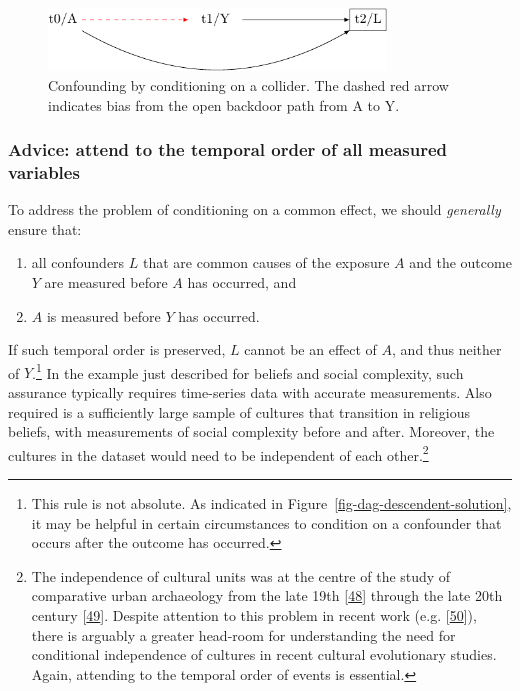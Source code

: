 \documentclass[
  singlecolumn]{article}
\providecommand{\tightlist}{%
  \setlength{\itemsep}{0pt}\setlength{\parskip}{0pt}}\usepackage{longtable,booktabs,array}
\begin{document}
\begin{figure}

{\centering \includegraphics[width=0.8\textwidth,height=\textheight]{causal-dags_files/figure-pdf/fig-dag-common-effect-1.pdf}

}

\caption{\label{fig-dag-common-effect}Confounding by conditioning on a
collider. The dashed red arrow indicates bias from the open backdoor
path from A to Y.}

\end{figure}

\hypertarget{advice-attend-to-the-temporal-order-of-all-measured-variables-1}{%
\subsubsection{Advice: attend to the temporal order of all measured
variables}\label{advice-attend-to-the-temporal-order-of-all-measured-variables-1}}

To address the problem of conditioning on a common effect, we should
\emph{generally} ensure that:

\begin{enumerate}
\def\labelenumi{\arabic{enumi}.}
\tightlist
\item
  all confounders \(L\) that are common causes of the exposure \(A\) and
  the outcome \(Y\) are measured before \(A\) has occurred, and
\item
  \(A\) is measured before \(Y\) has occurred.
\end{enumerate}

If such temporal order is preserved, \(L\) cannot be an effect of \(A\),
and thus neither of \(Y\).\footnote{This rule is not absolute. As
  indicated in Figure~\ref{fig-dag-descendent-solution}, it may be
  helpful in certain circumstances to condition on a confounder that
  occurs after the outcome has occurred.} In the example just described
for beliefs and social complexity, such assurance typically requires
time-series data with accurate measurements. Also required is a
sufficiently large sample of cultures that transition in religious
beliefs, with measurements of social complexity before and after.
Moreover, the cultures in the dataset would need to be independent of
each other.\footnote{The independence of cultural units was at the
  centre of the study of comparative urban archaeology from the late
  19th {[}\protect\hyperlink{ref-decoulanges1903}{48}{]} through the
  late 20th century {[}\protect\hyperlink{ref-wheatley1971}{49}{]}.
  Despite attention to this problem in recent work (e.g.
  {[}\protect\hyperlink{ref-watts2016}{50}{]}), there is arguably a
  greater head-room for understanding the need for conditional
  independence of cultures in recent cultural evolutionary studies.
  Again, attending to the temporal order of events is essential.}
\end{document}
